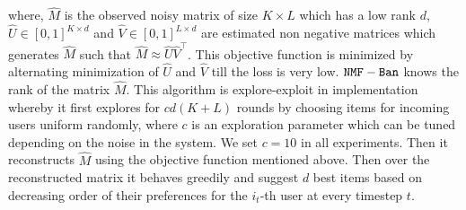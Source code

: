 where, $\hat{M}$ is the observed noisy matrix of size $K \times L$ which has a low rank $d$, $\hat{U} \in [0,1]^{K \times d}$ and $\hat{V} \in [0,1]^{L \times d}$ are estimated non negative matrices which  generates $\hat{M}$ such that $\hat{M} \approx \hat{U}\hat{V}^{\intercal}$. This objective function is minimized by alternating minimization of $\hat{U}$ and $\hat{V}$ till the loss is very low. ${\tt NMF-Ban}$ knows the rank of the matrix $\hat{M}$. This algorithm is explore-exploit in implementation whereby it first explores for $cd(K + L)$ rounds by choosing items for incoming users uniform randomly, where $c$ is an exploration parameter which can be tuned depending on the noise in the system. We set $c=10$ in all experiments. Then it reconstructs $\hat{M}$ using the objective function mentioned above. Then over the reconstructed matrix it behaves greedily and suggest $d$ best items based on decreasing order of their preferences for the $i_t$-th user at every timestep $t$. 



%
%
%


